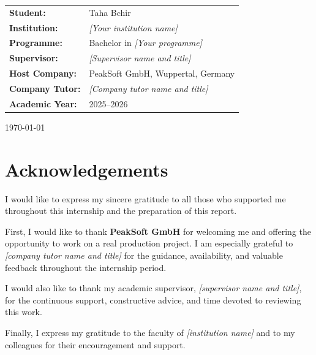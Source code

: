 \documentclass[12pt,a4paper]{report}
\begin{document}
{\begin{titlepage}
    \begin{flushleft}
      \renewcommand{\arraystretch}{1.3}
      \begin{tabular}{ll}
        \textbf{Student:}       & Taha Bchir \\
        \textbf{Institution:}   & \emph{[Your institution name]} \\
        \textbf{Programme:}     & Bachelor in \emph{[Your programme]} \\
        \textbf{Supervisor:}    & \emph{[Supervisor name and title]} \\
        \textbf{Host Company:}  & PeakSoft GmbH, Wuppertal, Germany \\
        \textbf{Company Tutor:} & \emph{[Company tutor name and title]} \\
        \textbf{Academic Year:} & 2025--2026 \\
      \end{tabular}
    \end{flushleft}

    \vfill
    {\large \today\par}
  \end{titlepage}
}

\setcounter{page}{1}


\chapter*{Acknowledgements}
{}

I would like to express my sincere gratitude to all those who supported me throughout
this internship and the preparation of this report.

First, I would like to thank \textbf{PeakSoft GmbH} for welcoming me and offering the
opportunity to work on a real production project.
I am especially grateful to \emph{[company tutor name and title]} for the guidance,
availability, and valuable feedback throughout the internship period.

I would also like to thank my academic supervisor, \emph{[supervisor name and title]},
for the continuous support, constructive advice, and time devoted to reviewing this work.

Finally, I express my gratitude to the faculty of \emph{[institution name]} and to my
colleagues for their encouragement and support.
\end{document}
